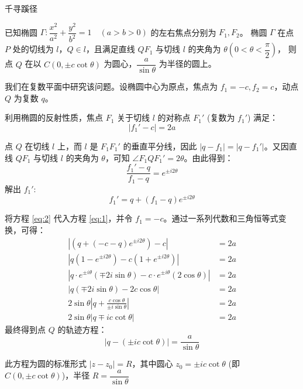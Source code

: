 \documentclass{ctexart}
\begin{document}
\thispagestyle{fancy}

\begin{center}
    \begin{chaptertitle}[复数专题]{\faBookOpen}{千寻蹊径}
    \end{chaptertitle}
\end{center}


\begin{examplebox}
已知椭圆 $\Gamma: \dfrac{x^2}{a^2} + \dfrac{y^2}{b^2} = 1 \quad (a>b>0)$ 的左右焦点分别为 $F_1, F_2$。
椭圆 $\Gamma$ 在点 $P$ 处的切线为 $l$，$Q \in l$，且满足直线 $QF_1$ 与切线 $l$ 的夹角为 $\theta \left(0 < \theta < \dfrac{\pi}{2}\right)$，
则点 $Q$ 在以 $C(0, \pm c\cot\theta)$ 为圆心，$\dfrac{a}{\sin\theta}$ 为半径的圆上。
\end{examplebox}

\begin{analysisbox}

我们在复数平面中研究该问题。设椭圆中心为原点，焦点为 $f_1 = -c, f_2 = c$，动点 $Q$ 为复数 $q$。

利用椭圆的反射性质，焦点 $F_1$ 关于切线 $l$ 的对称点 $F_1'$ (复数为 $f_1'$) 满足：
\begin{equation}
    |f_1' - c| = 2a \label{eq:1}
\end{equation}

点 $Q$ 在切线 $l$ 上，而 $l$ 是 $F_1F_1'$ 的垂直平分线，因此 $|q - f_1| = |q - f_1'|$。又因直线 $QF_1$ 与切线 $l$ 的夹角为 $\theta$，可知 $\angle F_1QF_1' = 2\theta$。由此得到：
\[
    \frac{f_1' - q}{f_1 - q} = e^{\pm i 2\theta}
\]
解出 $f_1'$:
\begin{equation}
    f_1' = q + (f_1 - q)e^{\pm i 2\theta} \label{eq:2}
\end{equation}

将方程 \eqref{eq:2} 代入方程 \eqref{eq:1}，并令 $f_1 = -c$。通过一系列代数和三角恒等式变换，可得：
\begin{align*}
    | (q + (-c - q)e^{\pm i 2\theta}) - c | &= 2a \\
    | q(1 - e^{\pm i 2\theta}) - c(1 + e^{\pm i 2\theta}) | &= 2a \\
    | q \cdot e^{\pm i\theta}(\mp 2i \sin\theta) - c \cdot e^{\pm i\theta}(2 \cos\theta) | &= 2a \\
    | q(\mp 2i \sin\theta) - 2c \cos\theta | &= 2a \\
    2\sin\theta \left| q + \frac{c \cos\theta}{\pm i \sin\theta} \right| &= 2a \\
    2\sin\theta \left| q \mp i c \cot\theta \right| &= 2a
\end{align*}
最终得到点 $Q$ 的轨迹方程：
\[
    |q - (\pm i c \cot\theta)| = \frac{a}{\sin\theta}
\]

此方程为圆的标准形式 $|z - z_0| = R$，其中圆心 $z_0 = \pm i c \cot\theta$ (即 $C(0, \pm c \cot\theta)$)，半径 $R = \dfrac{a}{\sin\theta}$

\end{analysisbox}
\end{document}
